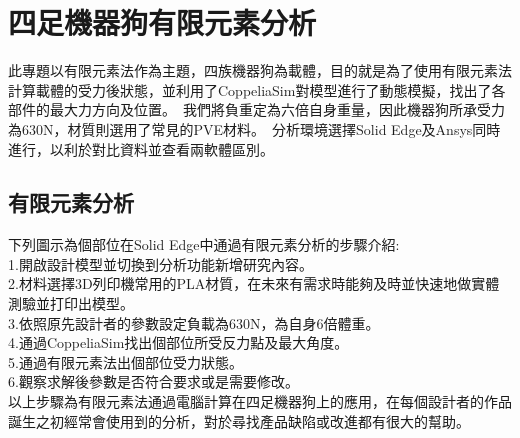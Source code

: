 \chapter{四足機器狗有限元素分析}

此專題以有限元素法作為主題，四族機器狗為載體，目的就是為了使用有限元素法計算載體的受力後狀態，並利用了CoppeliaSim對模型進行了動態模擬，找出了各部件的最大力方向及位置。\
我們將負重定為六倍自身重量，因此機器狗所承受力為630N，材質則選用了常見的PVE材料。\
分析環境選擇Solid Edge及Ansys同時進行，以利於對比資料並查看兩軟體區別。\\

\section{有限元素分析}
 下列圖示為個部位在Solid Edge中通過有限元素分析的步驟介紹:\\
 
1.開啟設計模型並切換到分析功能新增研究內容。\\

2.材料選擇3D列印機常用的PLA材質，在未來有需求時能夠及時並快速地做實體測驗並打印出模型。\\

3.依照原先設計者的參數設定負載為630N，為自身6倍體重。\\

4.通過CoppeliaSim找出個部位所受反力點及最大角度。\\

5.通過有限元素法出個部位受力狀態。\\

6.觀察求解後參數是否符合要求或是需要修改。\\

以上步驟為有限元素法通過電腦計算在四足機器狗上的應用，在每個設計者的作品誕生之初經常會使用到的分析，對於尋找產品缺陷或改進都有很大的幫助。\\
\newpage
